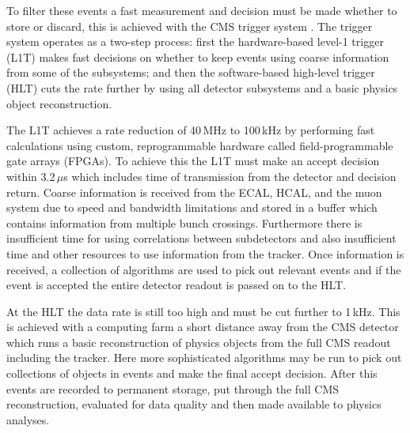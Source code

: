 To filter these events a fast measurement and decision must be made whether to store or discard, this is achieved with the CMS trigger system \cite{trigger}. The trigger system operates as a two-step process: first the hardware-based level-1 trigger (L1T) makes fast decisions on whether to keep events using coarse information from some of the subsystems; and then the software-based high-level trigger (HLT) cuts the rate further by using all detector subsystems and a basic physics object reconstruction. 


The L1T achieves a rate reduction of 40\,MHz to 100\,kHz by performing fast calculations using custom, reprogrammable hardware called field-programmable gate arrays (FPGAs).
To achieve this the L1T must make an accept decision within 3.2\,$\mu$s which includes time of transmission from the detector and decision return. 
Coarse information is received from the ECAL, HCAL, and the muon system due to speed and bandwidth limitations and stored in a buffer which contains information from multiple bunch crossings. 
Furthermore there is insufficient time for using correlations between subdetectors and also insufficient time and other resources to use information from the tracker. 
Once information is received, a collection of algorithms are used to pick out relevant events and if the event is accepted the entire detector readout is passed on to the HLT.


At the HLT the data rate is still too high and must be cut further to 1\,kHz. This is achieved with a computing farm a short distance away from the CMS detector which runs a basic reconstruction of physics objects from the full CMS readout including the tracker. Here more sophisticated algorithms may be run to pick out collections of objects in events and make the final accept decision.
After this events are recorded to permanent storage, put through the full CMS reconstruction, evaluated for data quality and then made available to physics analyses. 





